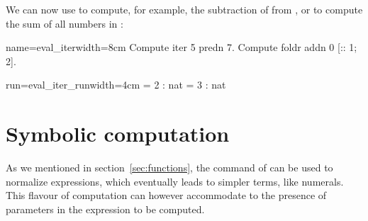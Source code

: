 
We can now use  to compute, for example,
the subtraction of  from , or 
to compute the
sum of all numbers in \C{[:: 1; 2]}:

\begin{coq-left}{name=eval_iter}{width=8cm}
Compute iter 5 predn 7.
Compute foldr addn 0 [:: 1; 2].
\end{coq-left}
\begin{coqout-right}{run=eval_iter_run}{width=4cm}
 = 2 : nat
 = 3 : nat
\end{coqout-right}


\section{Symbolic computation}\label{sec:symcomp}

As we mentioned in section~\ref{sec:functions}, the 
command of \Coq{} can be used to normalize expressions, which
eventually leads to simpler terms, like numerals. This flavour of
computation can however accommodate to the presence of parameters in
the expression to be computed.


